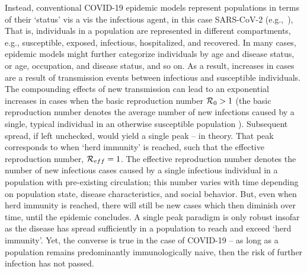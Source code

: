Instead, conventional COVID-19 epidemic
models represent populations in terms of their `status' vis
a vis the infectious agent, in this case 
SARS-CoV-2 (e.g.,~\citep{ferguson2020report,kucharski2020early,kissler_medrxiv2020,park_medrxiv2020,kraemer_2020sci,li_science2020,wu2020estimating}),
That is, individuals
in a population are represented in different compartments, e.g.,
susceptible, exposed, infectious,
hospitalized, and recovered.  In many cases, epidemic models
might further categorize individuals by age and disease status, or age, occupation,
and disease status, and so on.  As a result, increases in cases
are a result of transmission events between infectious
and susceptible individuals.  The compounding effects 
of new transmission can lead to an exponential increases in cases 
when the basic reproduction number ${\cal{R}}_0>1$ (the
basic reproduction number denotes the average number of new
infections caused by a single, typical individual in an otherwise
susceptible population \citep{anderson1991infectious}).  Subsequent
spread, if left unchecked, would yield a single peak -- in theory. That 
peak corresponds to when `herd immunity' is reached, such
that the effective reproduction number, ${\cal{R}}_{eff}=1$.
The effective reproduction number denotes the number of new
infectious cases caused by a single infectious individual
in a population with pre-existing circulation; this number varies with
time depending on population state, disease characteristics, and 
social behavior.
But, even when herd immunity is reached, there will still be new cases which then
diminish over time, until the epidemic concludes.  
A single peak paradigm is
only robust insofar as the disease has spread
sufficiently in a population to reach and exceed `herd immunity'.
Yet, the converse
is true in the case of COVID-19 -- as long as 
a population remains predominantly immunologically
naive, then the risk of further infection has not passed. 

